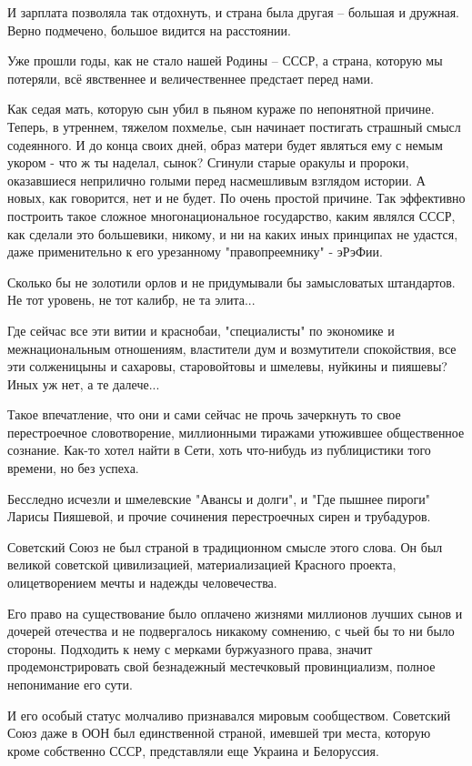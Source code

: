 И зарплата позволяла так отдохнуть, и страна была другая – большая и дружная.
Верно подмечено, большое видится на расстоянии.

Уже прошли годы, как не стало нашей Родины – СССР, а страна, которую мы
потеряли, всё явственнее и величественнее предстает перед нами.

Как седая мать, которую сын убил в пьяном кураже по непонятной причине. Теперь,
в утреннем, тяжелом похмелье, сын начинает постигать страшный смысл содеянного.
И до конца своих дней, образ матери будет являться ему с немым укором - что ж
ты наделал, сынок?  Сгинули старые оракулы и пророки, оказавшиеся неприлично
голыми перед насмешливым взглядом истории. А новых, как говорится, нет и не
будет. По очень простой причине. Так эффективно построить такое сложное
многонациональное государство, каким являлся СССР, как сделали это большевики,
никому, и ни на каких иных принципах не удастся, даже применительно к его
урезанному "правопреемнику" - эРэФии.

Сколько бы не золотили орлов и не придумывали бы замысловатых штандартов. Не
тот уровень, не тот калибр, не та элита...

Где сейчас все эти витии и краснобаи, "специалисты" по экономике и
межнациональным отношениям, властители дум и возмутители спокойствия, все эти
солженицыны и сахаровы, старовойтовы и шмелевы, нуйкины и пияшевы? Иных уж нет,
а те далече...

Такое впечатление, что они и сами сейчас не прочь зачеркнуть то свое
перестроечное словотворение, миллионными тиражами утюжившее общественное
сознание. Как-то хотел найти в Сети, хоть что-нибудь из публицистики того
времени, но без успеха.

Бесследно исчезли и шмелевские "Авансы и долги", и "Где пышнее пироги" Ларисы
Пияшевой, и прочие сочинения перестроечных сирен и трубадуров.

Советский Союз не был страной в традиционном смысле этого слова. Он был великой
советской цивилизацией, материализацией Красного проекта, олицетворением мечты
и надежды человечества.

Его право на существование было оплачено жизнями миллионов лучших сынов и
дочерей отечества и не подвергалось никакому сомнению, с чьей бы то ни было
стороны. Подходить к нему с мерками буржуазного права, значит
продемонстрировать свой безнадежный местечковый провинциализм, полное
непонимание его сути.

И его особый статус молчаливо признавался мировым сообществом. Советский Союз
даже в ООН был единственной страной, имевшей три места, которую кроме
собственно СССР, представляли еще Украина и Белоруссия.

